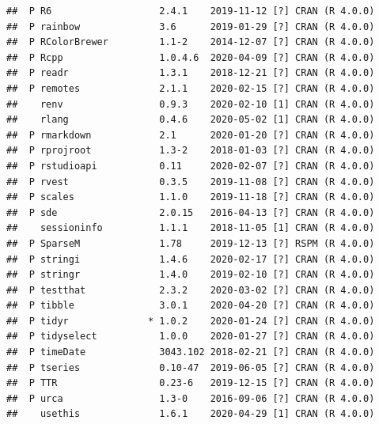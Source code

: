 \documentclass[11pt,a4paper,]{article}
\begin{document}
\begin{verbatim}
##  P R6                   2.4.1    2019-11-12 [?] CRAN (R 4.0.0)                                 
##  P rainbow              3.6      2019-01-29 [?] CRAN (R 4.0.0)                                 
##  P RColorBrewer         1.1-2    2014-12-07 [?] CRAN (R 4.0.0)                                 
##  P Rcpp                 1.0.4.6  2020-04-09 [?] CRAN (R 4.0.0)                                 
##  P readr                1.3.1    2018-12-21 [?] CRAN (R 4.0.0)                                 
##  P remotes              2.1.1    2020-02-15 [?] CRAN (R 4.0.0)                                 
##    renv                 0.9.3    2020-02-10 [1] CRAN (R 4.0.0)                                 
##    rlang                0.4.6    2020-05-02 [1] CRAN (R 4.0.0)                                 
##  P rmarkdown            2.1      2020-01-20 [?] CRAN (R 4.0.0)                                 
##  P rprojroot            1.3-2    2018-01-03 [?] CRAN (R 4.0.0)                                 
##  P rstudioapi           0.11     2020-02-07 [?] CRAN (R 4.0.0)                                 
##  P rvest                0.3.5    2019-11-08 [?] CRAN (R 4.0.0)                                 
##  P scales               1.1.0    2019-11-18 [?] CRAN (R 4.0.0)                                 
##  P sde                  2.0.15   2016-04-13 [?] CRAN (R 4.0.0)                                 
##    sessioninfo          1.1.1    2018-11-05 [1] CRAN (R 4.0.0)                                 
##  P SparseM              1.78     2019-12-13 [?] RSPM (R 4.0.0)                                 
##  P stringi              1.4.6    2020-02-17 [?] CRAN (R 4.0.0)                                 
##  P stringr              1.4.0    2019-02-10 [?] CRAN (R 4.0.0)                                 
##  P testthat             2.3.2    2020-03-02 [?] CRAN (R 4.0.0)                                 
##  P tibble               3.0.1    2020-04-20 [?] CRAN (R 4.0.0)                                 
##  P tidyr              * 1.0.2    2020-01-24 [?] CRAN (R 4.0.0)                                 
##  P tidyselect           1.0.0    2020-01-27 [?] CRAN (R 4.0.0)                                 
##  P timeDate             3043.102 2018-02-21 [?] CRAN (R 4.0.0)                                 
##  P tseries              0.10-47  2019-06-05 [?] CRAN (R 4.0.0)                                 
##  P TTR                  0.23-6   2019-12-15 [?] CRAN (R 4.0.0)                                 
##  P urca                 1.3-0    2016-09-06 [?] CRAN (R 4.0.0)                                 
##    usethis              1.6.1    2020-04-29 [1] CRAN (R 4.0.0)                                 

\end{verbatim}
\end{document}
